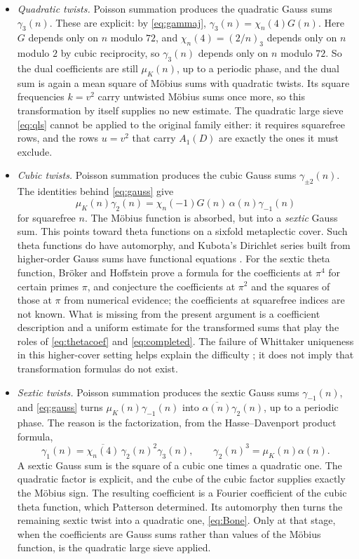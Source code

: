 \documentclass[11pt]{article}
\newcommand{\muk}{\mu_K}
\numberwithin{equation}{section}
\begin{document}
\begin{itemize}
\item \emph{Quadratic twists.} Poisson summation produces the quadratic Gauss sums $\gamma_3(n)$. These
are explicit: by \eqref{eq:gammaj}, $\gamma_3(n)=\chi_n(4)G(n)$. Here $G$ depends only on $n$ modulo
$72$, and $\chi_n(4)=(2/n)_3$ depends only on $n$ modulo $2$ by cubic reciprocity, so $\gamma_3(n)$ depends
only on $n$ modulo $72$. So the dual coefficients are still $\muk(n)$, up to a periodic phase, and the dual sum is again a
mean square of M\"obius sums with quadratic twists. Its square frequencies $k=v^2$ carry untwisted
M\"obius sums once more, so this transformation by itself supplies no new estimate. The quadratic large sieve
\eqref{eq:qls} cannot be applied to the original family either: it requires squarefree rows, and the
rows $u=v^2$ that carry $A_1(D)$ are exactly the ones it must exclude.
\item \emph{Cubic twists.} Poisson summation produces the cubic Gauss sums $\gamma_{\pm2}(n)$. The
identities behind \eqref{eq:gauss} give
\begin{equation}\label{eq:cubicdual}
 \muk(n)\gamma_2(n)=\chi_n(-1)G(n)\,\alpha(n)\gamma_{-1}(n)
\end{equation}
for squarefree $n$. The M\"obius function is absorbed, but into a \emph{sextic} Gauss sum.
This points toward theta functions on a sixfold metaplectic cover.
Such theta functions do have automorphy, and Kubota's Dirichlet series
built from higher-order Gauss sums have functional equations \cite{BB}.
For the sextic theta function, Br\"oker and Hoffstein \cite{BH} prove a formula for the
coefficients at $\pi^4$ for certain primes $\pi$, and conjecture the coefficients at $\pi^2$
and the squares of those at $\pi$ from numerical evidence; the coefficients at squarefree
indices are not known.
What is missing from the present argument is a coefficient description
and a uniform estimate for the transformed sums that play the roles
of \eqref{eq:thetacoef} and \eqref{eq:completed}.
The failure of Whittaker uniqueness in this higher-cover setting helps
explain the difficulty \cite{KP,BH}; it does not imply that transformation
formulas do not exist.
\item \emph{Sextic twists.} Poisson summation produces the sextic Gauss sums $\gamma_{-1}(n)$, and
\eqref{eq:gauss} turns $\muk(n)\gamma_{-1}(n)$ into $\overline{\alpha(n)}\gamma_2(n)$, up to a periodic
phase. The reason is the factorization, from the Hasse--Davenport product formula,
\begin{equation}\label{eq:hdfactor}
 \gamma_1(n)=\overline{\chi_n(4)}\,\gamma_2(n)^2\gamma_3(n),\qquad \gamma_2(n)^3=\muk(n)\alpha(n).
\end{equation}
A sextic Gauss sum is the square of a cubic one times a quadratic one. The quadratic factor is
explicit, and the cube of the cubic factor supplies exactly the M\"obius sign. The resulting coefficient
is a Fourier coefficient of the cubic theta function, which Patterson determined. Its automorphy then
turns the remaining sextic twist into a quadratic one, \eqref{eq:Bone}. Only at that stage, when the
coefficients are Gauss sums rather than values of the M\"obius function, is the quadratic large sieve applied.
\end{itemize}
\end{document}
